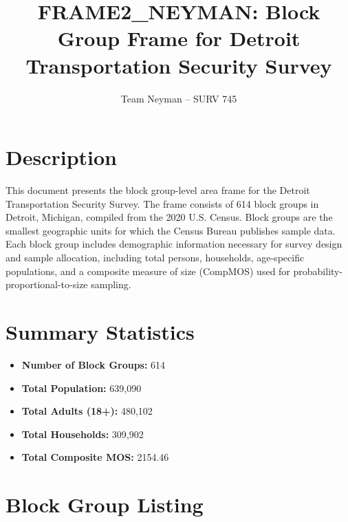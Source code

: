 \documentclass[11pt,landscape]{article}
\title{FRAME2\_NEYMAN: Block Group Frame for Detroit Transportation Security Survey}
\author{Team Neyman -- SURV 745}
\date{}
\begin{document}
\maketitle

\section*{Description}

This document presents the block group-level area frame for the Detroit Transportation Security Survey. The frame consists of 614 block groups in Detroit, Michigan, compiled from the 2020 U.S. Census. Block groups are the smallest geographic units for which the Census Bureau publishes sample data. Each block group includes demographic information necessary for survey design and sample allocation, including total persons, households, age-specific populations, and a composite measure of size (CompMOS) used for probability-proportional-to-size sampling.

\section*{Summary Statistics}

\begin{itemize}
\item \textbf{Number of Block Groups:} 614
\item \textbf{Total Population:} 639,090
\item \textbf{Total Adults (18+):} 480,102
\item \textbf{Total Households:} 309,902
\item \textbf{Total Composite MOS:} 2154.46\
\end{itemize}

\newpage

\section*{Block Group Listing}
\end{document}
